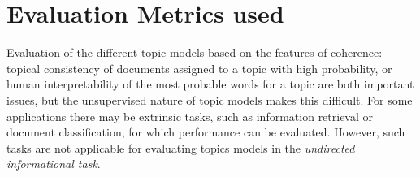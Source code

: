 \documentclass{sig-alternate}
\begin{document}

 


\section{Evaluation Metrics used}

\label{sec:evaluation}

Evaluation of the different topic models based on the features of
coherence: topical consistency of documents assigned to a topic with
high probability, or human interpretability of the most probable words
for a topic are both important issues, but the unsupervised nature of
topic models makes this difficult. For some applications there may be
extrinsic tasks, such as information retrieval or document
classification, for which performance can be evaluated. However, such
tasks are not applicable for evaluating topics models in the {\it
  undirected informational task}.
\end{document}
